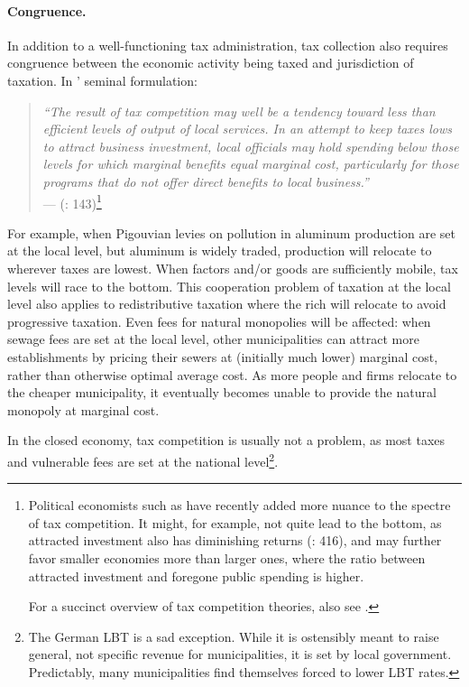 \paragraph[Congruence]{Congruence.} In addition to a well-functioning tax administration, tax collection also requires congruence between the economic activity being taxed and jurisdiction of taxation. In \citeauthor{Oates1972}' seminal formulation:
\begin{quote}
	\emph{``The result of tax competition may well be a tendency toward less than efficient levels of output of local services. In an attempt to keep taxes lows to attract business investment, local officials may hold spending below those levels for which marginal benefits equal marginal cost, particularly for those programs that do not offer direct benefits to local business.''}\\
	--- \citeauthor{Oates1972} (\citeyear{Oates1972}: 143)\footnote{
		Political economists such as \cite{Dehejia1999} have recently added more nuance to the spectre of tax competition. It might, for example, not quite lead to the bottom, as attracted investment also has diminishing returns (\citeyear{Dehejia1999}: 416), and may further favor smaller economies more than larger ones, where the ratio between attracted investment and foregone public spending is higher.
		
		For a succinct overview of tax competition theories, also see \cite{Wilson1999}.}
\end{quote}
For example, when Pigouvian levies on pollution in aluminum production are set at the local level, but aluminum is widely traded, production will relocate to wherever taxes are lowest. When factors and/or goods are sufficiently mobile, tax levels will race to the bottom. This cooperation problem of taxation at the local level also applies to redistributive taxation where the rich will relocate to avoid progressive taxation. Even fees for natural monopolies will be affected: when sewage fees are set at the local level, other municipalities can attract more establishments by pricing their sewers at (initially much lower) marginal cost, rather than otherwise optimal average cost. As more people and firms relocate to the cheaper municipality, it eventually becomes unable to provide the natural monopoly at marginal cost.

In the closed economy, tax competition is usually not a problem, as most taxes and vulnerable fees are set at the national level\footnote{
	The German \gls{LBT} is a sad exception. While it is ostensibly meant to raise general, not specific revenue for municipalities, it is set by local government. Predictably, many municipalities find themselves forced to lower \gls{LBT} rates.}.

